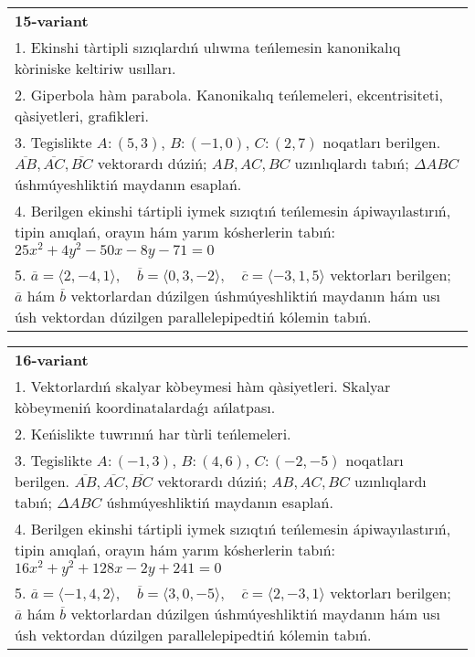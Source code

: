 \documentclass{article}
\begin{document}
\begin{tabular}{m{17cm}}
\textbf{15-variant}\\
1. Ekinshi tàrtipli sızıqlardıń ulıwma teńlemesin kanonikalıq kòriniske keltiriw usılları.\\

2. Giperbola hàm parabola. Kanonikalıq teńlemeleri, ekcentrisiteti, qàsiyetleri, grafikleri.\\

3. Tegislikte $A: (5, 3)$, $B: (-1, 0)$, $C: (2, 7)$ noqatları berilgen. $\overline{AB}, \overline{AC}, \overline{BC}$ vektorardı dúziń; $AB, AC, BC$ uzınlıqlardı tabıń; $\Delta ABC$ úshmúyeshliktiń maydanın esaplań. \\

4. Berilgen ekinshi tártipli iymek sızıqtıń teńlemesin ápiwayılastırıń, tipin anıqlań, orayın hám yarım kósherlerin tabıń: $25x^2+4y^2-50x-8y-71=0$\\

5. \(\overline{a} = \langle 2, -4, 1 \rangle, \quad \overline{b} = \langle 0, 3, -2 \rangle, \quad \overline{c} = \langle -3, 1, 5 \rangle\) vektorları berilgen; \(\overline{a}\) hám \(\overline{b}\) vektorlardan dúzilgen úshmúyeshliktiń maydanın hám usı úsh vektordan dúzilgen parallelepipedtiń kólemin tabıń.
\end{tabular}
\vspace{1cm}


\begin{tabular}{m{17cm}}
\textbf{16-variant}\\
1. Vektorlardıń skalyar kòbeymesi hàm qàsiyetleri. Skalyar kòbeymeniń koordinatalardaǵı ańlatpası.\\

2. Keńislikte tuwrınıń har tùrli teńlemeleri. \\

3. Tegislikte $A: (-1, 3)$, $B: (4, 6)$, $C: (-2, -5)$ noqatları berilgen. $\overline{AB}, \overline{AC}, \overline{BC}$ vektorardı dúziń; $AB, AC, BC$ uzınlıqlardı tabıń; $\Delta ABC$ úshmúyeshliktiń maydanın esaplań. \\

4. Berilgen ekinshi tártipli iymek sızıqtıń teńlemesin ápiwayılastırıń, tipin anıqlań, orayın hám yarım kósherlerin tabıń: $16x^2+y^2+128x-2y+241=0$\\

5. \(\overline{a} = \langle -1, 4, 2 \rangle, \quad \overline{b} = \langle 3, 0, -5 \rangle, \quad \overline{c} = \langle 2, -3, 1 \rangle\) vektorları berilgen; \(\overline{a}\) hám \(\overline{b}\) vektorlardan dúzilgen úshmúyeshliktiń maydanın hám usı úsh vektordan dúzilgen parallelepipedtiń kólemin tabıń.
\end{tabular}
\vspace{1cm}
\end{document}
